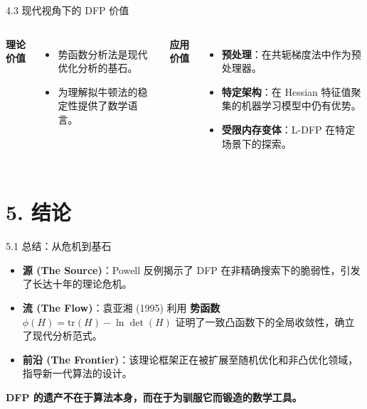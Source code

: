 \documentclass[11pt,hyperref={pdfpagelabels=false}]{beamer}
\begin{document}
\begin{frame}{4.3 现代视角下的 DFP 价值}
    \begin{columns}
        \textbf{理论价值}
        \begin{itemize}
            \item 势函数分析法是现代优化分析的基石。
            \item 为理解拟牛顿法的稳定性提供了数学语言。
        \end{itemize}

        \textbf{应用价值}
        \begin{itemize}
            \item \textbf{预处理}：在共轭梯度法中作为预处理器。
            \item \textbf{特定架构}：在 Hessian 特征值聚集的机器学习模型中仍有优势。
            \item \textbf{受限内存变体}：L-DFP 在特定场景下的探索。
        \end{itemize}
    \end{columns}
\end{frame}

\section{5. 结论}

\begin{frame}{5.1 总结：从危机到基石}
    \begin{itemize}
        \item \textbf{源 (The Source)}：Powell 反例揭示了 DFP 在非精确搜索下的脆弱性，引发了长达十年的理论危机。
        \item \textbf{流 (The Flow)}：袁亚湘 (1995) 利用 \textbf{势函数} $\phi(H) = \text{tr}(H) - \ln \det(H)$ 证明了一致凸函数下的全局收敛性，确立了现代分析范式。
        \item \textbf{前沿 (The Frontier)}：该理论框架正在被扩展至随机优化和非凸优化领域，指导新一代算法的设计。
    \end{itemize}
    \vspace{0.5cm}
    \begin{center}
        \textbf{DFP 的遗产不在于算法本身，而在于为驯服它而锻造的数学工具。}
    \end{center}
\end{frame}
\end{document}
